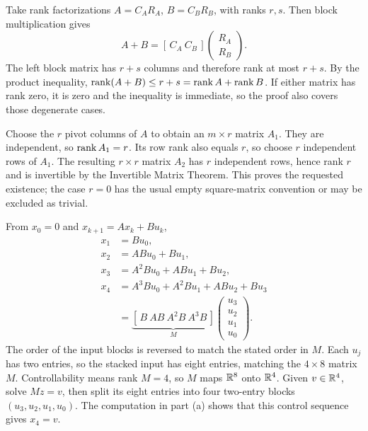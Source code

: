 Take rank factorizations $A=C_AR_A$, $B=C_BR_B$, with ranks $r,s$.
Then block multiplication gives
\[
 A+B=[\,C_A\ C_B\,]\begin{pmatrix}R_A\\R_B\end{pmatrix}.
\]
The left block matrix has $r+s$ columns and therefore rank at most $r+s$.
By the product inequality, $\operatorname{rank}(A+B)\le r+s=\operatorname{rank} A+\operatorname{rank} B$.
If either matrix has rank zero, it is zero and the inequality is immediate,
so the proof also covers those degenerate cases.

Choose the $r$ pivot columns of $A$ to obtain an $m\times r$ matrix $A_1$.
They are independent, so $\operatorname{rank} A_1=r$.
Its row rank also equals $r$, so choose $r$ independent rows of $A_1$.
The resulting $r\times r$ matrix $A_2$ has $r$ independent rows, hence
rank $r$ and is invertible by the Invertible Matrix Theorem.
This proves the requested existence; the case $r=0$ has the usual empty
square-matrix convention or may be excluded as trivial.

From $x_0=0$ and $x_{k+1}=Ax_k+Bu_k$,
\begin{align*}
 x_1&=Bu_0,\\
 x_2&=ABu_0+Bu_1,\\
 x_3&=A^2Bu_0+ABu_1+Bu_2,\\
 x_4&=A^3Bu_0+A^2Bu_1+ABu_2+Bu_3\\
 &=\underbrace{[\,B\ AB\ A^2B\ A^3B\,]}_{M}
    \begin{pmatrix}u_3\\u_2\\u_1\\u_0\end{pmatrix}.
\end{align*}
The order of the input blocks is reversed to match the stated order in $M$.
Each $u_j$ has two entries, so the stacked input has eight entries,
matching the $4\times8$ matrix $M$.
Controllability means rank $M=4$, so $M$ maps $\mathbb{R}^8$ onto $\mathbb{R}^4$.
Given $v\in\mathbb{R}^4$, solve $Mz=v$, then split its eight entries into four
two-entry blocks $(u_3,u_2,u_1,u_0)$. The computation in part (a) shows
that this control sequence gives $x_4=v$.

